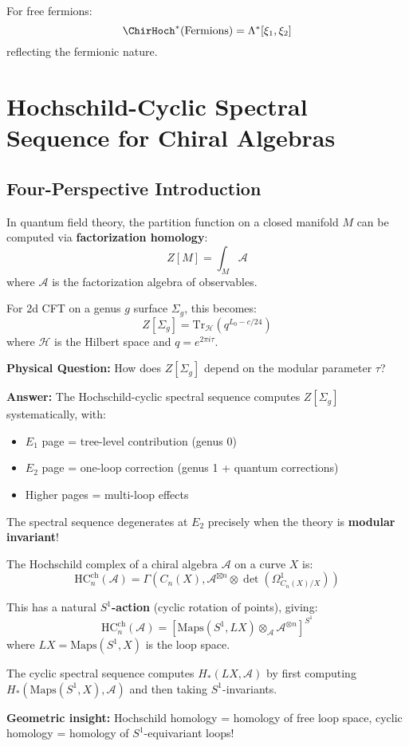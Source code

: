 For free fermions:
$$\ChirHoch^*(\text{Fermions}) = \Lambda^*[\xi_1, \xi_2]$$
reflecting the fermionic nature.
\section{Hochschild-Cyclic Spectral Sequence for Chiral Algebras}
\label{sec:hochschild-cyclic-spectral}

\subsection{Four-Perspective Introduction}

\begin{motivation}
In quantum field theory, the partition function on a closed manifold $M$ can be 
computed via \textbf{factorization homology}:
$$Z[M] = \int_M \mathcal{A}$$
where $\mathcal{A}$ is the factorization algebra of observables.

For 2d CFT on a genus $g$ surface $\Sigma_g$, this becomes:
$$Z[\Sigma_g] = \text{Tr}_{\mathcal{H}}(q^{L_0-c/24})$$
where $\mathcal{H}$ is the Hilbert space and $q = e^{2\pi i \tau}$.

\textbf{Physical Question:} How does $Z[\Sigma_g]$ depend on the modular parameter $\tau$?

\textbf{Answer:} The Hochschild-cyclic spectral sequence computes $Z[\Sigma_g]$ 
systematically, with:
\begin{itemize}
\item $E_1$ page = tree-level contribution (genus 0)
\item $E_2$ page = one-loop correction (genus 1 + quantum corrections)
\item Higher pages = multi-loop effects
\end{itemize}

The spectral sequence degenerates at $E_2$ precisely when the theory is 
\textbf{modular invariant}!
\end{motivation}

\begin{construction}
The Hochschild complex of a chiral algebra $\mathcal{A}$ on a curve $X$ is:
$$\text{HC}_n^{\text{ch}}(\mathcal{A}) = \Gamma(C_n(X), 
   \mathcal{A}^{\boxtimes n} \otimes \det(\Omega^1_{C_n(X)/X}))$$

This has a natural \textbf{$S^1$-action} (cyclic rotation of points), giving:
$$\text{HC}_n^{\text{ch}}(\mathcal{A}) = 
   [\text{Maps}(S^1, LX) \otimes_{\mathcal{A}} \mathcal{A}^{\otimes n}]^{S^1}$$
where $LX = \text{Maps}(S^1, X)$ is the loop space.

The cyclic spectral sequence computes $H_*(LX, \mathcal{A})$ by first computing 
$H_*(\text{Maps}(S^1, X), \mathcal{A})$ and then taking $S^1$-invariants.

\textbf{Geometric insight:} Hochschild homology = homology of free loop space, 
cyclic homology = homology of $S^1$-equivariant loops!
\end{construction}

